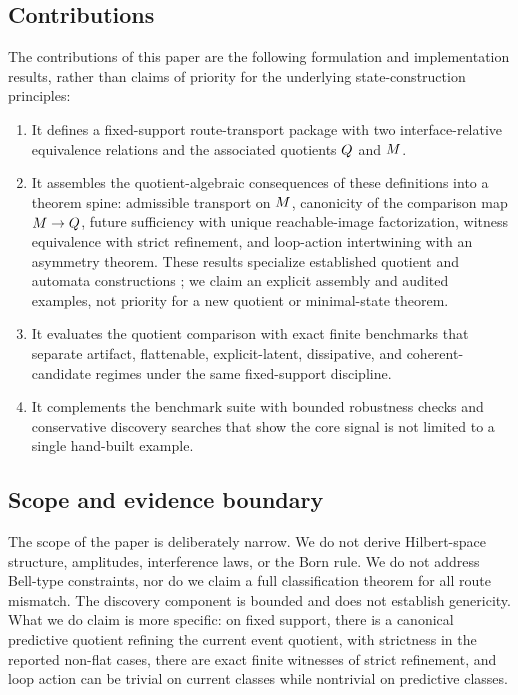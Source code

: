 \documentclass[11pt]{article}
\theoremstyle{definition}
\begin{document}
\subsection{Contributions}\label{subsec:intro-contributions}
The contributions of this paper are the following formulation and implementation results, rather than claims of priority for the underlying state-construction principles:
\begin{enumerate}
\item It defines a fixed-support route-transport package with two interface-relative equivalence relations and the associated quotients $Q$ and $M$.
\item It assembles the quotient-algebraic consequences of these definitions into a theorem spine: admissible transport on $M$, canonicity of the comparison map $M \to Q$, future sufficiency with unique reachable-image factorization, witness equivalence with strict refinement, and loop-action intertwining with an asymmetry theorem. These results specialize established quotient and automata constructions \citep{BurrisSankappanavar1981CourseUniversalAlgebra,Nerode1958LinearAutomatonTransformations}; we claim an explicit assembly and audited examples, not priority for a new quotient or minimal-state theorem.
\item It evaluates the quotient comparison with exact finite benchmarks that separate artifact, flattenable, explicit-latent, dissipative, and coherent-candidate regimes under the same fixed-support discipline.
\item It complements the benchmark suite with bounded robustness checks and conservative discovery searches that show the core signal is not limited to a single hand-built example.
\end{enumerate}

\subsection{Scope and evidence boundary}\label{subsec:intro-scope}
The scope of the paper is deliberately narrow. We do not derive Hilbert-space structure, amplitudes, interference laws, or the Born rule. We do not address Bell-type constraints, nor do we claim a full classification theorem for all route mismatch. The discovery component is bounded and does not establish genericity. What we do claim is more specific: on fixed support, there is a canonical predictive quotient refining the current event quotient, with strictness in the reported non-flat cases, there are exact finite witnesses of strict refinement, and loop action can be trivial on current classes while nontrivial on predictive classes.
\end{document}

